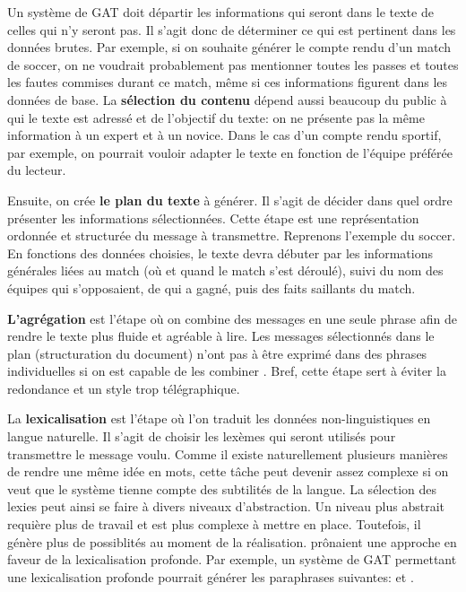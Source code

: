 
Un système de \ac{GAT} doit départir les informations qui seront dans le texte de celles qui n'y seront pas. Il s'agit donc de déterminer ce qui est pertinent dans les données brutes. Par exemple, si on souhaite générer le compte rendu d'un match de soccer, on ne voudrait probablement pas mentionner toutes les passes et toutes les fautes commises durant ce match, même si ces informations figurent dans les données de base. La \textbf{sélection du contenu} dépend aussi beaucoup du public à qui le texte est adressé et de l'objectif du texte: on ne présente pas la même information à un expert et à un novice. Dans le cas d'un compte rendu sportif, par exemple, on pourrait vouloir adapter le texte en fonction de l'équipe préférée du lecteur.

Ensuite, on crée \textbf{le plan du texte} à générer. Il s'agit de décider dans quel ordre présenter les informations sélectionnées. Cette étape est une représentation ordonnée et structurée du message à transmettre. Reprenons l'exemple du soccer. En fonctions des données choisies, le texte devra débuter par les informations générales liées au match (où et quand le match s'est déroulé), suivi du nom des équipes qui s'opposaient, de qui a gagné, puis des faits saillants du match.

\textbf{L'agrégation} est l'étape où on combine des messages en une seule phrase afin de rendre le texte plus fluide et agréable à lire. Les messages sélectionnés dans le plan (structuration du document) n'ont pas à être exprimé dans des phrases individuelles si on est capable de les combiner \citep{ChengCapturingInteractionAggregation2000}. Bref, cette étape sert à éviter la redondance et un style trop télégraphique.

La \textbf{lexicalisation} est l'étape où l'on traduit les données non-linguistiques en langue naturelle. Il s'agit de choisir les lexèmes qui seront utilisés pour transmettre le message voulu. Comme il existe naturellement plusieurs manières de rendre une même idée en mots, cette tâche peut devenir assez complexe si on veut que le système tienne compte des subtilités de la langue. La sélection des lexies peut ainsi se faire à divers niveaux d'abstraction. Un niveau plus abstrait requière plus de travail et est plus complexe à mettre en place. Toutefois, il génère plus de possiblités au moment de la réalisation. \cite{ElhadadFloatingConstraintsLexical1997} prônaient une approche en faveur de la lexicalisation profonde. Par exemple, un système de \ac{GAT} permettant une lexicalisation profonde pourrait générer les paraphrases suivantes:  et .

